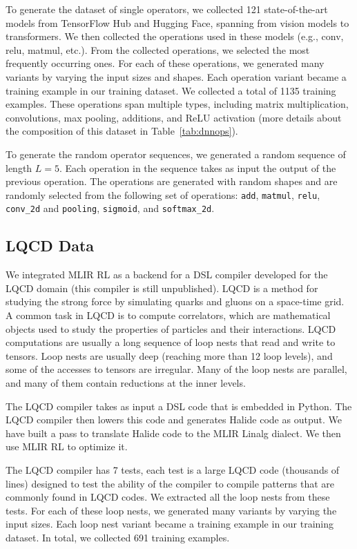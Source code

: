 \documentclass[10pt,twocolumn]{article}
\begin{document}
To generate the dataset of single operators, we collected 121 state-of-the-art models from TensorFlow Hub and Hugging Face, spanning from vision models to transformers. We then collected the operations used in these models (e.g., conv, relu, matmul, etc.). From the collected operations, we selected the most frequently occurring ones. For each of these operations, we generated many variants by varying the input sizes and shapes. Each operation variant became a training example in our training dataset. We collected a total of 1135 training examples. These operations span multiple types, including matrix multiplication, convolutions, max pooling, additions, and ReLU activation (more details about the composition of this dataset in Table~\ref{tab:dnnops}).

To generate the random operator sequences, we generated a random sequence of length $L=5$. Each operation in the sequence takes as input the output of the previous operation. The operations are generated with random shapes and are randomly selected from the following set of operations: \texttt{add}, \texttt{matmul}, \texttt{relu}, \texttt{conv\_2d} and \texttt{pooling}, \texttt{sigmoid}, and \texttt{softmax\_2d}.

\subsection{LQCD Data}

We integrated MLIR RL as a backend for a DSL compiler developed for the LQCD domain (this compiler is still unpublished). LQCD is a method for studying the strong force by simulating quarks and gluons on a space-time grid. A common task in LQCD is to compute correlators, which are mathematical objects used to study the properties of particles and their interactions. LQCD computations are usually a long sequence of loop nests that read and write to tensors. Loop nests are usually deep (reaching more than 12 loop levels), and some of the accesses to tensors are irregular. Many of the loop nests are parallel, and many of them contain reductions at the inner levels.

The LQCD compiler takes as input a DSL code that is embedded in Python. The LQCD compiler then lowers this code and generates Halide code as output. We have built a pass to translate Halide code to the MLIR Linalg dialect. We then use MLIR RL to optimize it.

The LQCD compiler has 7 tests, each test is a large LQCD code (thousands of lines) designed to test the ability of the compiler to compile patterns that are commonly found in LQCD codes. We extracted all the loop nests from these tests. For each of these loop nests, we generated many variants by varying the input sizes. Each loop nest variant became a training example in our training dataset. In total, we collected 691 training examples.
\end{document}
